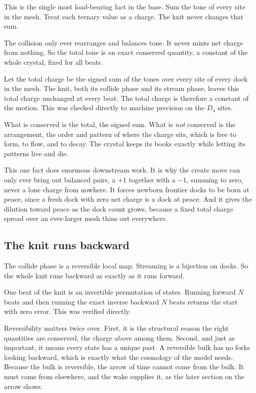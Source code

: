 This is the single most load-bearing fact in the base. Sum the tone of every site in the mesh. Treat each ternary value as a charge. The knit never changes that sum.

The collision only ever rearranges and balances tone. It never mints net charge from nothing. So the total tone is an exact conserved quantity, a constant of the whole crystal, fixed for all beats.

\begin{theorem}
Let the total charge be the signed sum of the tones over every site of every dock in the mesh. The knit, both its collide phase and its stream phase, leaves this total charge unchanged at every beat. The total charge is therefore a constant of the motion. This was checked directly to machine precision on the $D_4$ sites.
\end{theorem}

What is conserved is the total, the signed sum. What is \emph{not} conserved is the arrangement, the order and pattern of where the charge sits, which is free to form, to flow, and to decay. The crystal keeps its books exactly while letting its patterns live and die.

This one fact does enormous downstream work. It is why the create move can only ever bring out balanced pairs, a $+1$ together with a $-1$, summing to zero, never a lone charge from nowhere. It forces newborn frontier docks to be born at peace, since a fresh dock with zero net charge is a dock at peace. And it gives the dilution toward peace as the dock count grows, because a fixed total charge spread over an ever-larger mesh thins out everywhere.

\subsection{The knit runs backward}

The collide phase is a reversible local map. Streaming is a bijection on docks. So the whole knit runs backward as exactly as it runs forward.

\begin{lemma}
One beat of the knit is an invertible permutation of states. Running forward $N$ beats and then running the exact inverse backward $N$ beats returns the start with zero error. This was verified directly.
\end{lemma}

Reversibility matters twice over. First, it is the structural reason the right quantities are conserved, the charge above among them. Second, and just as important, it means every state has a unique past. A reversible bulk has no forks looking backward, which is exactly what the cosmology of the model needs. Because the bulk is reversible, the arrow of time cannot come from the bulk. It must come from elsewhere, and the wake supplies it, as the later section on the arrow shows.


